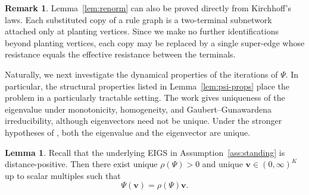 \documentclass{article}
\theoremstyle{plain}
\theoremstyle{definition}
\newtheorem{lemma}[theorem]{Lemma}
\newtheorem{remark}[theorem]{Remark}
\begin{document}
\begin{remark}
Lemma~\ref{lem:renorm} can also be proved directly from Kirchhoff's laws.
Each substituted copy of a rule graph is a two-terminal subnetwork attached only at planting vertices.
Since we make no further identifications beyond planting vertices, each copy may be replaced by a single super-edge whose resistance equals the effective resistance between the terminals.
\end{remark}

Naturally, we next investigate the dynamical properties of the iterations of $\Psi$.
In particular, the structural properties listed in Lemma~\ref{lem:psi-props} place the problem in a particularly tractable setting.
The work \cite{gaubert2004perronfrobenius} gives uniqueness of the eigenvalue under monotonicity, homogeneity, and Gaubert--Gunawardena irreducibility, although eigenvectors need not be unique.
Under the stronger hypotheses of \cite{nussbaum1986convexity,lemmens2012nonlinear}, both the eigenvalue and the eigenvector are unique.

\begin{lemma}\label{thm:sdprimitive_eigenpair}
Recall that the underlying EIGS in Assumption~\ref{ass:standing} is distance-positive.
Then there exist unique $\rho(\Psi)>0$ and unique $\mathbf v\in(0,\infty)^K$ up to scalar multiples such that
\[
\Psi(\mathbf v)=\rho(\Psi)\mathbf v.
\]
\end{lemma}
\end{document}
